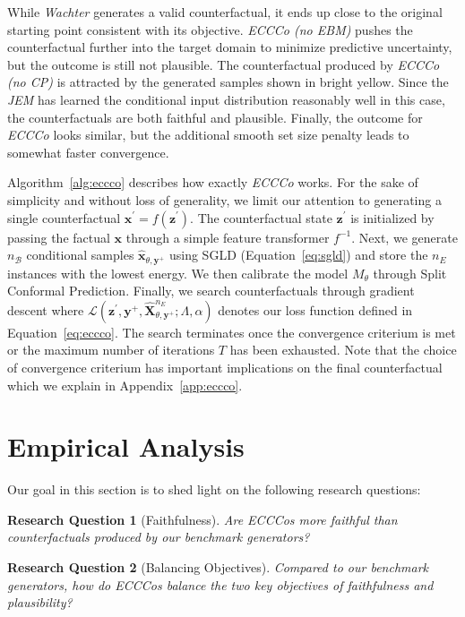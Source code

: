 \documentclass{article}
\newtheorem{question}{Research Question}[section]
\begin{document}
While \textit{Wachter} generates a valid counterfactual, it ends up close to the original starting point consistent with its objective. \textit{ECCCo (no EBM)} pushes the counterfactual further into the target domain to minimize predictive uncertainty, but the outcome is still not plausible. The counterfactual produced by \textit{ECCCo (no CP)} is attracted by the generated samples shown in bright yellow. Since the \textit{JEM} has learned the conditional input distribution reasonably well in this case, the counterfactuals are both faithful and plausible. Finally, the outcome for \textit{ECCCo} looks similar, but the additional smooth set size penalty leads to somewhat faster convergence. 

Algorithm~\ref{alg:eccco} describes how exactly \textit{ECCCo} works. For the sake of simplicity and without loss of generality, we limit our attention to generating a single counterfactual $\mathbf{x}^\prime=f(\mathbf{z}^\prime)$. The counterfactual state $\mathbf{z}^\prime$ is initialized by passing the factual $\mathbf{x}$ through a simple feature transformer $f^{-1}$. Next, we generate $n_{\mathcal{B}}$ conditional samples $\hat{\mathbf{x}}_{\theta,\mathbf{y}^+}$ using SGLD (Equation~\ref{eq:sgld}) and store the $n_E$ instances with the lowest energy. We then calibrate the model $M_{\theta}$ through Split Conformal Prediction. Finally, we search counterfactuals through gradient descent where $\mathcal{L}(\mathbf{z}^\prime,\mathbf{y}^+,\hat{\mathbf{X}}^{n_E}_{\theta,\mathbf{y}^+}; \Lambda, \alpha)$ denotes our loss function defined in Equation~\ref{eq:eccco}. The search terminates once the convergence criterium is met or the maximum number of iterations $T$ has been exhausted. Note that the choice of convergence criterium has important implications on the final counterfactual which we explain in Appendix~\ref{app:eccco}.

\section{Empirical Analysis}\label{emp}

Our goal in this section is to shed light on the following research questions:

\begin{question}[Faithfulness]\label{rq:faithfulness}
  Are ECCCos more faithful than counterfactuals produced by our benchmark generators?
\end{question}

\begin{question}[Balancing Objectives]\label{rq:plausibility}
  Compared to our benchmark generators, how do ECCCos balance the two key objectives of faithfulness and plausibility?
\end{question}
\end{document}
